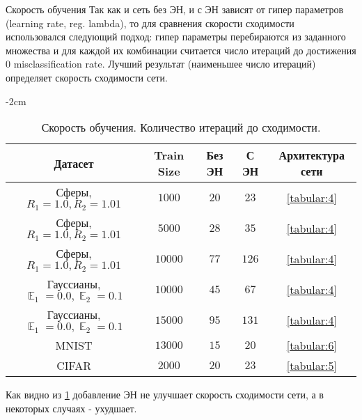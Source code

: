 \documentclass[a4paper,12pt,titlepage,finall]{article}
\DeclareMathOperator*{\EE}{\mathbb{E}}
\begin{document}
\begin{section}{Скорость обучения}
	Так как и сеть без ЭН, и с ЭН зависят от гипер параметров (learning rate, reg. lambda), то для сравнения скорости сходимости использовался следующий подход: гипер параметры перебираются из заданного множества и для каждой их комбинации считается число итераций до достижения 0 misclassification rate. Лучший результат (наименьшее число итераций) определяет скорость сходимости сети.
\begin{table}[H]
	\begin{center}
		\addtolength{\leftskip} {-2cm}
		\addtolength{\rightskip}{-2cm}
		\begin{tabular}{c|c|c|c|c}
			Датасет & Train Size & Без ЭН & С ЭН & Архитектура сети\\
			\hline
			Сферы, $R_{1}=1.0, R_{2}=1.01$         & $1000$   & $20$   & $23$     & \ref{tabular:4} \\
			Сферы, $R_{1}=1.0, R_{2}=1.01$         & $5000$   & $28$   & $35$     & \ref{tabular:4} \\
			Сферы, $R_{1}=1.0, R_{2}=1.01$         & $10000$  & $77$   & $126$    & \ref{tabular:4} \\
			Гауссианы, $\EE_{1}=0.0, \EE_{2}=0.1$  & $10000$  & $45$   & $67$     & \ref{tabular:4} \\
			Гауссианы, $\EE_{1}=0.0, \EE_{2}=0.1$  & $15000$  & $95$   & $131$    & \ref{tabular:4} \\
			MNIST                                  & $13000$  & $15$   & $20$     & \ref{tabular:6} \\
			CIFAR                                  & $2000$   & $20$   & $23$     & \ref{tabular:5} \\
		\end{tabular}
		\caption{\label{tabular:2} Скорость обучения. Количество итераций до сходимости.}
	\end{center}
\end{table}
	Как видно из \ref{tabular:2} добавление ЭН не улучшает скорость сходимости сети, а в некоторых случаях - ухудшает.
\end{section}
\end{document}
